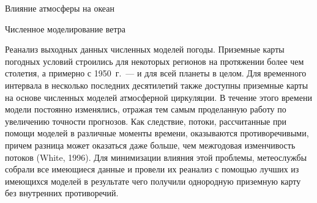 \begin{chapter}{Влияние атмосферы на океан}
\begin{section}{Численное моделирование ветра}
\begin{paragraph}{Реанализ выходных данных численных моделей погоды.}
Приземные карты погодных условий строились для некоторых регионов 
на протяжении более чем столетия, а примерно с 1950~г.~--- и для всей планеты 
в целом. Для временного интервала в несколько последних десятилетий также
доступны приземные карты на основе численных моделей атмосферной циркуляции.
В течение этого времени модели постоянно изменялись, отражая тем самым 
проделанную работу по увеличению точности прогнозов. Как следствие, потоки, 
рассчитанные при помощи моделей в различные моменты времени, оказываются 
противоречивыми, причем разница может оказаться даже больше, чем межгодовая
изменчивость потоков (White, 1996). Для минимизации влияния этой проблемы,
метеослужбы собрали все имеющиеся данные и провели их реанализ
с помощью лучших из имеющихся моделей в результате чего получили однородную 
приземную карту без внутренних противоречий.
%


\end{paragraph}
\end{section}
\end{chapter}
